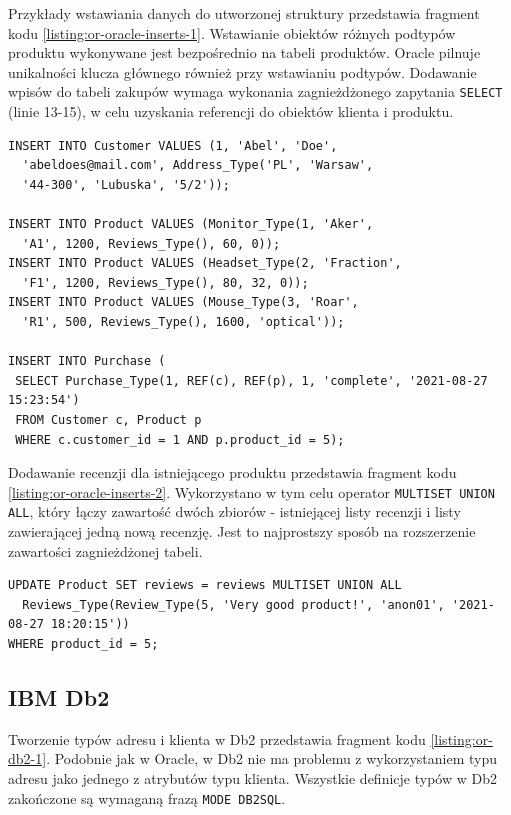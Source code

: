 \documentclass[a4paper,twoside,12pt]{book}
\begin{document}
Przykłady wstawiania danych do utworzonej struktury przedstawia fragment kodu \ref{listing:or-oracle-inserts-1}. Wstawianie obiektów różnych podtypów produktu wykonywane jest bezpośrednio na tabeli produktów. Oracle pilnuje unikalności klucza głównego również przy wstawianiu podtypów. Dodawanie wpisów do tabeli zakupów wymaga wykonania zagnieżdżonego zapytania \lstinline{SELECT} (linie 13-15), w celu uzyskania referencji do obiektów klienta i produktu.

\begin{lstlisting}[style=SQL, caption={Wstawianie danych do bazy Oracle.}, label={listing:or-oracle-inserts-1}, captionpos=b]
INSERT INTO Customer VALUES (1, 'Abel', 'Doe', 
  'abeldoes@mail.com', Address_Type('PL', 'Warsaw', 
  '44-300', 'Lubuska', '5/2'));

INSERT INTO Product VALUES (Monitor_Type(1, 'Aker', 
  'A1', 1200, Reviews_Type(), 60, 0));
INSERT INTO Product VALUES (Headset_Type(2, 'Fraction', 
  'F1', 1200, Reviews_Type(), 80, 32, 0));
INSERT INTO Product VALUES (Mouse_Type(3, 'Roar', 
  'R1', 500, Reviews_Type(), 1600, 'optical'));

INSERT INTO Purchase (
 SELECT Purchase_Type(1, REF(c), REF(p), 1, 'complete', '2021-08-27 15:23:54') 
 FROM Customer c, Product p 
 WHERE c.customer_id = 1 AND p.product_id = 5);
\end{lstlisting}

Dodawanie recenzji dla istniejącego produktu przedstawia fragment kodu \ref{listing:or-oracle-inserts-2}. Wykorzystano w tym celu operator \lstinline{MULTISET UNION ALL}, który łączy zawartość dwóch zbiorów - istniejącej listy recenzji i listy zawierającej jedną nową recenzję. Jest to najprostszy sposób na rozszerzenie zawartości zagnieżdżonej tabeli. 

\begin{lstlisting}[style=SQL, caption={Dodawanie nowej recenzji produktu w Oracle.}, label={listing:or-oracle-inserts-2}, captionpos=b]
UPDATE Product SET reviews = reviews MULTISET UNION ALL 
  Reviews_Type(Review_Type(5, 'Very good product!', 'anon01', '2021-08-27 18:20:15'))
WHERE product_id = 5;
\end{lstlisting}

\subsection{IBM Db2}

Tworzenie typów adresu i klienta w Db2 przedstawia fragment kodu \ref{listing:or-db2-1}. Podobnie jak w Oracle, w Db2 nie ma problemu z wykorzystaniem typu adresu jako jednego z atrybutów typu klienta. Wszystkie definicje typów w Db2 zakończone są wymaganą frazą \lstinline{MODE DB2SQL}.  
\end{document}
